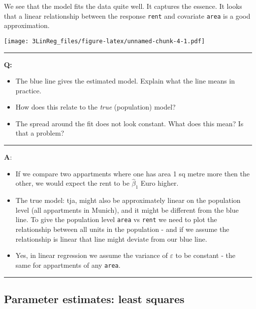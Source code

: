 \documentclass[]{article}
\providecommand{\tightlist}{%
  \setlength{\itemsep}{0pt}\setlength{\parskip}{0pt}}
\begin{document}
We see that the model fits the data quite well. It captures the essence.
It looks that a linear relationship between the response \texttt{rent}
and covariate \texttt{area} is a good approximation.

\texttt{[image: 3LinReg\_files/figure-latex/unnamed-chunk-4-1.pdf]}

\begin{center}\rule{0.5\linewidth}{\linethickness}\end{center}

\textbf{Q:}

\begin{itemize}
\tightlist
\item
  The blue line gives the estimated model. Explain what the line means
  in practice.
\item
  How does this relate to the \emph{true} (population) model?
\item
  The spread around the fit does not look constant. What does this mean?
  Is that a problem?
\end{itemize}

\begin{center}\rule{0.5\linewidth}{\linethickness}\end{center}

\textbf{A}:

\begin{itemize}
\tightlist
\item
  If we compare two appartments where one has area 1 sq metre more then
  the other, we would expect the rent to be \(\hat{\beta}_1\) Euro
  higher.
\item
  The true model: tja, might also be approximately linear on the
  population level (all appartments in Munich), and it might be
  different from the blue line. To give the population level
  \texttt{area} vs \texttt{rent} we need to plot the relationship
  between all units in the population - and if we assume the
  relationship is linear that line might deviate from our blue line.
\item
  Yes, in linear regression we assume the variance of \(\varepsilon\) to
  be constant - the same for appartments of any \texttt{area}.
\end{itemize}

\begin{center}\rule{0.5\linewidth}{\linethickness}\end{center}

\hypertarget{parameter-estimates-least-squares}{%
\subsection{Parameter estimates: least
squares}\label{parameter-estimates-least-squares}}
\end{document}
